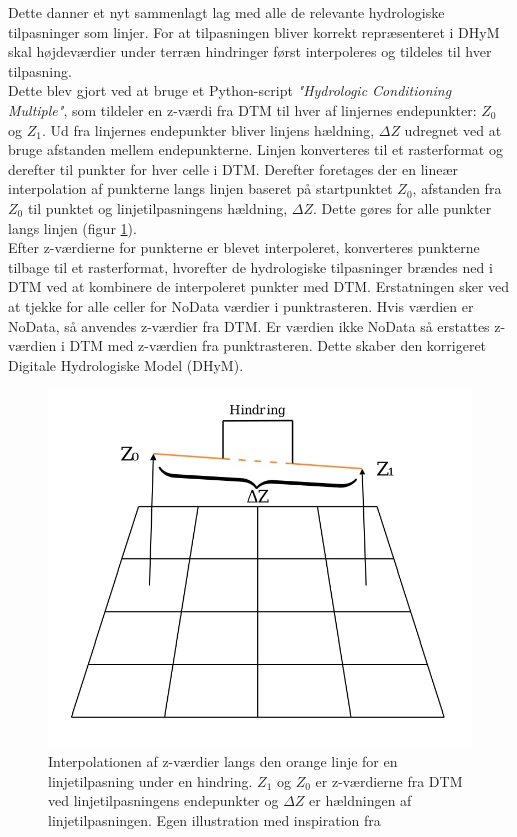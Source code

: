 Dette danner et nyt sammenlagt lag med alle de relevante hydrologiske tilpasninger som linjer. For at tilpasningen bliver korrekt repræsenteret i DHyM skal højdeværdier under terræn hindringer først interpoleres og tildeles til hver tilpasning.\\
Dette blev gjort ved at bruge et Python-script \textit{"Hydrologic Conditioning Multiple"}, som tildeler en z-værdi fra DTM til hver af linjernes endepunkter: $Z_0$ og $Z_1$. Ud fra linjernes endepunkter bliver linjens hældning, $\Delta{Z}$ udregnet ved at bruge afstanden mellem endepunkterne. Linjen konverteres til et rasterformat og derefter til punkter for hver celle i DTM. Derefter foretages der en lineær interpolation af punkterne langs linjen baseret på startpunktet $Z_0$, afstanden fra $Z_0$ til punktet og linjetilpasningens hældning, $\Delta{Z}$. Dette gøres for alle punkter langs linjen (figur \ref{Figur: Interpolation af Z-værdier}). \\

Efter z-værdierne for punkterne er blevet interpoleret, konverteres punkterne tilbage til et rasterformat, hvorefter de hydrologiske tilpasninger brændes ned i DTM ved at kombinere de interpoleret punkter med DTM. Erstatningen sker ved at tjekke for alle celler for NoData værdier i punktrasteren. Hvis værdien er NoData, så anvendes z-værdier fra DTM. Er værdien ikke NoData så erstattes z-værdien i DTM med z-værdien fra punktrasteren.
Dette skaber den korrigeret Digitale Hydrologiske Model (DHyM).

\begin{figure}[H]
    \centering
    \includegraphics[width=0.5\linewidth]{images/metode/dtm_hydro_z.jpg}
    \caption{Interpolationen af z-værdier langs den orange linje for en linjetilpasning under en hindring. $Z_1$ og $Z_0$ er z-værdierne fra DTM ved linjetilpasningens endepunkter og $\Delta{Z}$ er hældningen af linjetilpasningen. Egen illustration med inspiration fra \cite{balstrom_identification_2024}}
    \label{Figur: Interpolation af Z-værdier}
\end{figure}

